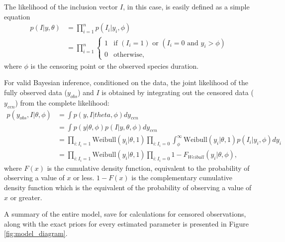 \documentclass[12pt,letterpaper]{article}
\begin{document}
The likelihood of the inclusion vector \(I\), in this case, is easily defined as a simple equation
\begin{align*}
  p(I | y, \theta) &= \prod_{i = 1}^{n} p(I_{i} | y_{i}, \phi) \\
  &= \prod_{i = 1}^{n} 
    \begin{cases} 
      1 & \text{if } (I_{i} = 1) \text{ or } (I_{i} = 0 \text{ and } y_{i} > \phi) \\ 
      0 & \text{otherwise},
    \end{cases}
\end{align*}
where \(\phi\) is the censoring point or the observed species duration.

For valid Bayesian inference, conditioned on the data, the joint likelihood of the fully observed data (\(y_{obs}\)) and \(I\) is obtained by integrating out the censored data (\(y_{cen}\)) from the complete likelihood:
\begin{align*}
  p(y_{obs}, I | \theta, \phi) &= \int p(y, I | theta, \phi) dy_{cen} \\
  &= \int p(y | \theta, \phi) p(I | y, \theta, \phi) dy_{cen} \\
  &= \prod_{i: I_{i} = 1} \mathrm{Weibull}(y_{i} | \theta, 1) \prod_{i: I_{i} = 0} \int_{\phi}^{\infty} \mathrm{Weibull}(y_{i} | \theta, 1) p(I_{i} | y_{i}, \phi) dy_{i} \\
  &= \prod_{i: I_{i} = 1} \mathrm{Weibull}(y_{i} | \theta, 1) \prod_{i : I_{i} = 0} 1 - F_{Weibull}(y_{i} | \theta, \phi),
\end{align*}
where \(F(x)\) is the cumulative density function, equivalent to the probability of observing a value of \(x\) or less. \(1 - F(x)\) is the complementary cumulative density function which is the equivalent of the probability of observing a value of \(x\) or greater.

A summary of the entire model, save for calculations for censored observations, along with the exact priors for every estimated parameter is presented in Figure \ref{fig:model_diagram}.
\end{document}
